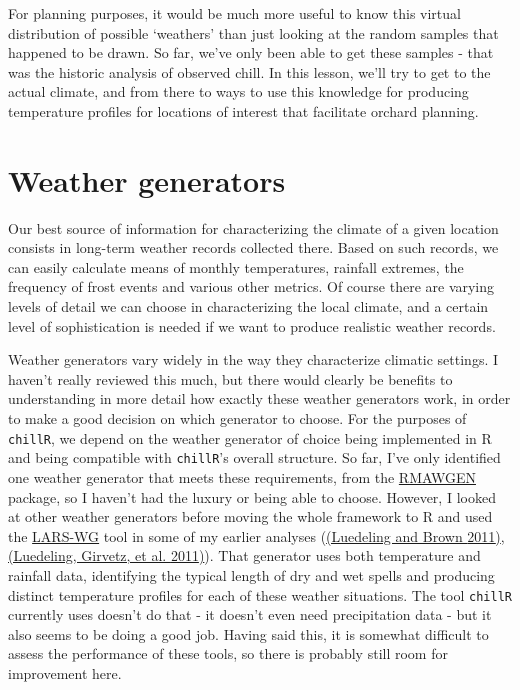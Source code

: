 \documentclass[
]{book}
\begin{document}
For planning purposes, it would be much more useful to know this virtual distribution of possible `weathers' than just looking at the random samples that happened to be drawn. So far, we've only been able to get these samples - that was the historic analysis of observed chill. In this lesson, we'll try to get to the actual climate, and from there to ways to use this knowledge for producing temperature profiles for locations of interest that facilitate orchard planning.

\hypertarget{weather-generators}{%
\section{Weather generators}\label{weather-generators}}

Our best source of information for characterizing the climate of a given location consists in long-term weather records collected there. Based on such records, we can easily calculate means of monthly temperatures, rainfall extremes, the frequency of frost events and various other metrics. Of course there are varying levels of detail we can choose in characterizing the local climate, and a certain level of sophistication is needed if we want to produce realistic weather records.

Weather generators vary widely in the way they characterize climatic settings. I haven't really reviewed this much, but there would clearly be benefits to understanding in more detail how exactly these weather generators work, in order to make a good decision on which generator to choose. For the purposes of \texttt{chillR}, we depend on the weather generator of choice being implemented in R and being compatible with \texttt{chillR}'s overall structure. So far, I've only identified one weather generator that meets these requirements, from the \href{https://cran.r-project.org/web/packages/RMAWGEN/index.html}{RMAWGEN} package, so I haven't had the luxury or being able to choose. However, I looked at other weather generators before moving the whole framework to R and used the \href{https://sites.google.com/view/lars-wg/}{LARS-WG} tool in some of my earlier analyses (\href{http://link.springer.com/10.1007/s00484-010-0352-y}{(Luedeling and Brown \protect\hyperlink{ref-luedeling_global_2011}{2011})}, \href{https://journals.plos.org/plosone/article?id=10.1371/journal.pone.0020155}{(Luedeling, Girvetz, et al. \protect\hyperlink{ref-luedeling2011climate}{2011})}). That generator uses both temperature and rainfall data, identifying the typical length of dry and wet spells and producing distinct temperature profiles for each of these weather situations. The tool \texttt{chillR} currently uses doesn't do that - it doesn't even need precipitation data - but it also seems to be doing a good job. Having said this, it is somewhat difficult to assess the performance of these tools, so there is probably still room for improvement here.
\end{document}
